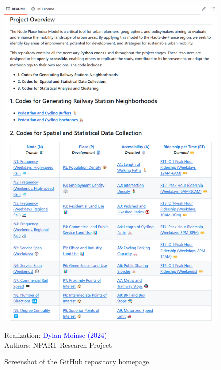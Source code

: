 \begin{refsegment}
\begin{figure}[h!]\vspace*{4pt}
    \caption{Screenshot of the GitHub repository homepage.}
    \label{fig-chap6:screen-github-1}
    \centerline{\includegraphics[width=1\columnwidth]{src/Figures/Chap-6/EN_EN_NPART_Screen_Github_1.png}}
    \vspace{5pt}
    \begin{flushright}\scriptsize{
    Realization: \textcolor{blue}{Dylan Moinse (2024)}
    \\
    Authors: \acrshort{NPART} Research Project
    }\end{flushright}
\end{figure}


\end{refsegment}
